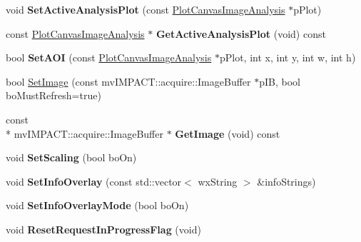 \begin{DoxyCompactItemize}
\item 
\hypertarget{class_image_canvas_a75898cdd7e1789e110b798037d9a6a4a}{void {\bfseries Set\+Active\+Analysis\+Plot} (const \hyperlink{class_plot_canvas_image_analysis}{Plot\+Canvas\+Image\+Analysis} $\ast$p\+Plot)}\label{class_image_canvas_a75898cdd7e1789e110b798037d9a6a4a}

\item 
\hypertarget{class_image_canvas_a59ee0ca0138add4ad861610690f41c77}{const \hyperlink{class_plot_canvas_image_analysis}{Plot\+Canvas\+Image\+Analysis} $\ast$ {\bfseries Get\+Active\+Analysis\+Plot} (void) const }\label{class_image_canvas_a59ee0ca0138add4ad861610690f41c77}

\item 
\hypertarget{class_image_canvas_a1748491c45b30ae132c9c96d1910b00e}{bool {\bfseries Set\+A\+O\+I} (const \hyperlink{class_plot_canvas_image_analysis}{Plot\+Canvas\+Image\+Analysis} $\ast$p\+Plot, int x, int y, int w, int h)}\label{class_image_canvas_a1748491c45b30ae132c9c96d1910b00e}

\item 
bool \hyperlink{class_image_canvas_aba3902aa128ee939ee26665cf9742d5d}{Set\+Image} (const mv\+I\+M\+P\+A\+C\+T\+::acquire\+::\+Image\+Buffer $\ast$p\+I\+B, bool bo\+Must\+Refresh=true)
\item 
\hypertarget{class_image_canvas_aa84fb42497a28fd90c3e74b415138b37}{const \\*
mv\+I\+M\+P\+A\+C\+T\+::acquire\+::\+Image\+Buffer $\ast$ {\bfseries Get\+Image} (void) const }\label{class_image_canvas_aa84fb42497a28fd90c3e74b415138b37}

\item 
\hypertarget{class_image_canvas_a88da52921ebe0a54de423c5fca25b5f9}{void {\bfseries Set\+Scaling} (bool bo\+On)}\label{class_image_canvas_a88da52921ebe0a54de423c5fca25b5f9}

\item 
\hypertarget{class_image_canvas_a2f8ed032c7cf09ef3948221e22c4ecc1}{void {\bfseries Set\+Info\+Overlay} (const std\+::vector$<$ wx\+String $>$ \&info\+Strings)}\label{class_image_canvas_a2f8ed032c7cf09ef3948221e22c4ecc1}

\item 
\hypertarget{class_image_canvas_a913ff75607832db40c3acac68da91b4d}{void {\bfseries Set\+Info\+Overlay\+Mode} (bool bo\+On)}\label{class_image_canvas_a913ff75607832db40c3acac68da91b4d}

\item 
\hypertarget{class_image_canvas_a972e7527243ac69732908dcd05d28142}{void {\bfseries Reset\+Request\+In\+Progress\+Flag} (void)}\label{class_image_canvas_a972e7527243ac69732908dcd05d28142}


\end{DoxyCompactItemize}
